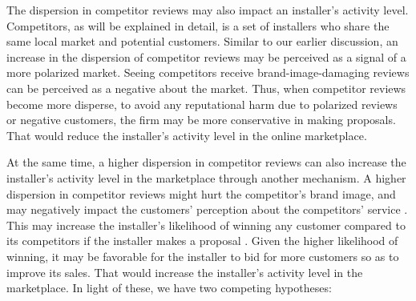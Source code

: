 \documentclass[msom,blindrev]{informs3}
\begin{document}
The dispersion in competitor reviews may also impact an installer's activity level. Competitors, as will be explained in detail, is a set of installers who share the same local market and potential customers. Similar to our earlier discussion, an increase in the dispersion of competitor reviews may be perceived as a signal of a more polarized market. Seeing competitors receive brand-image-damaging reviews can be perceived as a negative about the market. Thus, when competitor reviews become more disperse, to avoid any reputational harm due to polarized reviews or negative customers, the firm may be more conservative in making proposals. That would reduce the installer's activity level in the online marketplace.
%
%


At the same time, a higher dispersion in competitor reviews can also increase the installer's activity level in the marketplace through another mechanism. A higher dispersion in competitor reviews might hurt the competitor's brand image, and may negatively impact the customers' perception about the competitors' service \citep{chakraborty2018credibility,chakraborty2018effects,Zhu}. This may increase the installer's likelihood of winning any customer compared to its competitors if the installer makes a proposal \citep{demirag2011risks,moreno2014doing}. Given the higher likelihood of winning, it may be favorable for the installer to  bid for more customers so as to improve its sales. That would increase the installer's activity level in the marketplace. In light of these, we have two competing hypotheses:
\end{document}
